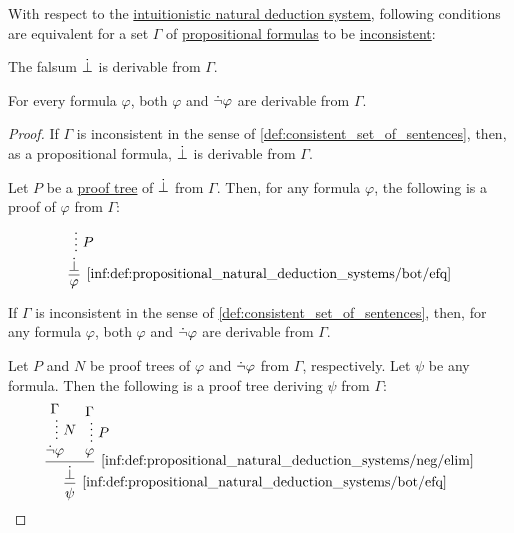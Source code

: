 \begin{proposition}\label{thm:propositional_consistent_set}
  With respect to the \hyperref[def:propositional_natural_deduction_systems]{intuitionistic natural deduction system}, following conditions are equivalent for a set \( \Gamma \) of \hyperref[def:propositional_syntax/formula]{propositional formulas} to be \hyperref[def:consistent_set_of_sentences]{inconsistent}:
  \begin{thmenum}
     The falsum \( \dot{\bot} \) is derivable from \( \Gamma \).

     For every formula \( \varphi \), both \( \varphi \) and \( \dot{\neg} \varphi \) are derivable from \( \Gamma \).
  \end{thmenum}
\end{proposition}
\begin{proof}

  \SufficiencySubProof* If \( \Gamma \) is inconsistent in the sense of \cref{def:consistent_set_of_sentences}, then, as a propositional formula, \( \dot{\bot} \) is derivable from \( \Gamma \).

  \NecessitySubProof* Let \( P \) be a \hyperref[def:propositional_natural_deduction_proof_tree]{proof tree} of \( \dot{\bot} \) from \( \Gamma \). Then, for any formula \( \varphi \), the following is a proof of \( \varphi \) from \( \Gamma \):
  \begin{equation*}
    \begin{prooftree}
      \hypo{}
      \ellipsis { \( P \) } { \synbot }
      \infer1[\ref{inf:def:propositional_natural_deduction_systems/bot/efq}]{ \varphi }.
    \end{prooftree}
  \end{equation*}


  \SufficiencySubProof* If \( \Gamma \) is inconsistent in the sense of \cref{def:consistent_set_of_sentences}, then, for any formula \( \varphi \), both \( \varphi \) and \( \dot{\neg} \varphi \) are derivable from \( \Gamma \).

  \NecessitySubProof* Let \( P \) and \( N \) be proof trees of \( \varphi \) and \( \dot{\neg} \varphi \) from \( \Gamma \), respectively. Let \( \psi \) be any formula. Then the following is a proof tree deriving \( \psi \) from \( \Gamma \):
  \begin{equation*}
    \begin{prooftree}
      \hypo{ \Gamma }
      \ellipsis { \( N \) } { \synneg \varphi }

      \hypo{ \Gamma }
      \ellipsis { \( P \) } { \varphi }

      \infer2[\ref{inf:def:propositional_natural_deduction_systems/neg/elim}]{ \synbot }.

      \infer1[\ref{inf:def:propositional_natural_deduction_systems/bot/efq}]{ \psi }.
    \end{prooftree}
  \end{equation*}
\end{proof}

